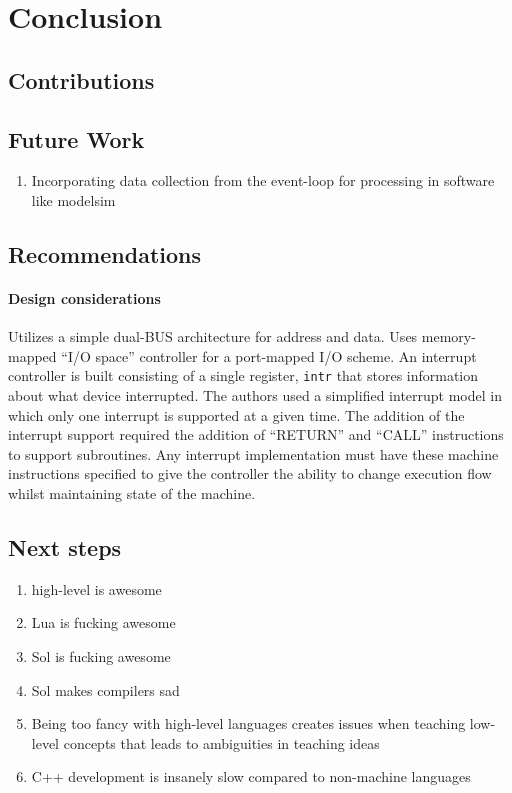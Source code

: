\chapter{Conclusion}
\label{ch:conclusion}


\section{Contributions}
\label{sec:contributions}

\section{Future Work}
\label{sec:future-work}

\begin{enumerate}
    \item Incorporating data collection from the event-loop for processing in software like modelsim
\end{enumerate}

\section{Recommendations}

\subsubsection{Design considerations\cite{Nakamura2013}}

Utilizes a simple dual-BUS architecture for address and data. Uses memory-mapped ``I/O space'' controller for a port-mapped I/O scheme. An interrupt controller is built consisting of a single register, \verb|intr| that stores information about what device interrupted. The authors used a simplified interrupt model in which only one interrupt is supported at a given time. The addition of the interrupt support required the addition of ``RETURN'' and ``CALL'' instructions to support subroutines. Any interrupt implementation must have these machine instructions specified to give the controller the ability to change execution flow whilst maintaining state of the machine. 

\section{Next steps}

\begin{enumerate}
    \item high-level is awesome
    \item Lua is fucking awesome
    \item Sol is fucking awesome
    \item Sol makes compilers sad
    \item Being too fancy with high-level languages creates issues when teaching low-level concepts that leads to ambiguities in teaching ideas
    \item C++ development is insanely slow compared to non-machine languages
\end{enumerate}